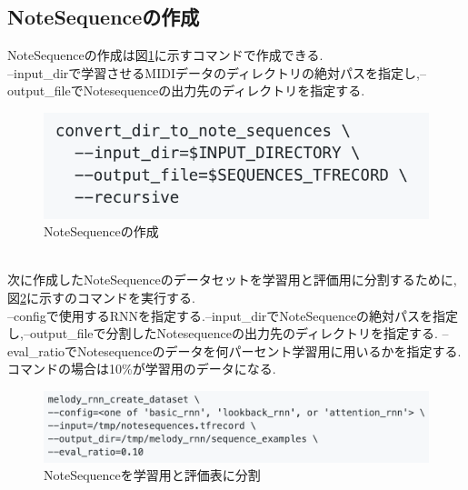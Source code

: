 \subsection{NoteSequenceの作成}
NoteSequenceの作成は図\ref{img:NoteSequenceの作成}に示すコマンドで作成できる.\\
--input\_dirで学習させるMIDIデータのディレクトリの絶対パスを指定し,--output\_fileでNotesequenceの出力先のディレクトリを指定する.\\
\begin{figure}[!ht]
    \begin{screen}
    \begin{center}
        \includegraphics[scale=1.2, clip]{./img/Notesequence_make.png}
        \caption{NoteSequenceの作成}
        \label{img:NoteSequenceの作成}
    \end{center}
    \end{screen}
\end{figure}\\
次に作成したNoteSequenceのデータセットを学習用と評価用に分割するために,図\ref{img:NoteSequenceを学習用と評価表に分割}に示すのコマンドを実行する.\\
--configで使用するRNNを指定する.--input\_dirでNoteSequenceの絶対パスを指定し,--output\_fileで分割したNotesequenceの出力先のディレクトリを指定する.
--eval\_ratioでNotesequenceのデータを何パーセント学習用に用いるかを指定する.コマンドの場合は10\%が学習用のデータになる.
\begin{figure}[!ht]
    \begin{screen}
    \begin{center}
        \includegraphics[scale=0.7, clip]{./img/Notesequence_split.png}
        \caption{NoteSequenceを学習用と評価表に分割}
        \label{img:NoteSequenceを学習用と評価表に分割}
    \end{center}
    \end{screen}
\end{figure}\\

